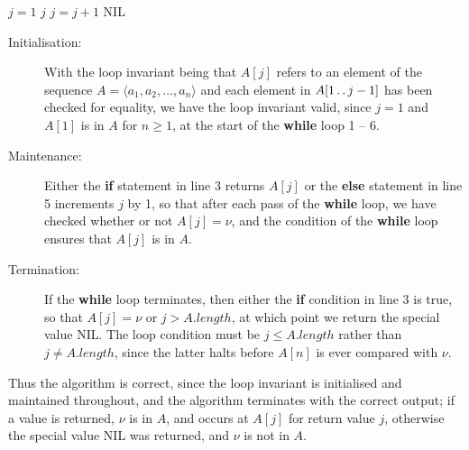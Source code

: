 \begin{algorithmic}[1]
  \STATE $j = 1$
  \RETURN $j$
  \ELSE
  \STATE $j = j + 1$
  \ENDIF
  \ENDWHILE
  \RETURN \textrm{NIL}
\end{algorithmic}

\begin{description}
  \item[Initialisation:] With the loop invariant being that $A[j]$ refers to an
    element of the sequence $A = \langle a_1, a_2, \ldots, a_n \rangle$ and
    each element in $A[1\mathinner{{\ldotp}\,{\ldotp}} j - 1]$ has been checked for equality, we
    have the loop invariant valid, since $j = 1$ and $A[1]$ is in $A$ for
    $n \ge 1$, at the start of the \textbf{while} loop 1 -- 6.
  \item[Maintenance:] Either the \textbf{if} statement in line 3 returns $A[j]$
    or the \textbf{else} statement in line 5 increments $j$ by 1, so that after
    each pass of the \textbf{while} loop, we have checked whether or not
    $A[j] = \nu$, and the condition of the \textbf{while} loop ensures that
    $A[j]$ is in $A$.
  \item[Termination:] If the \textbf{while} loop terminates, then either the
    \textbf{if} condition in line 3 is true, so that $A[j] = \nu$ or
    $j > A.\mathit{length}$, at which point we return the special value
    \textrm{NIL}. The loop condition must be $j \leq A.\mathit{length}$ rather
    than $j \neq A.\mathit{length}$, since the latter halts before $A[n]$ is
    ever compared with $\nu$.
\end{description}

Thus the algorithm is correct, since the loop invariant is initialised and
maintained throughout, and the algorithm terminates with the correct output;
if a value is returned, $\nu$ is in $A$, and occurs at $A[j]$ for return value
$j$, otherwise the special value \textrm{NIL} was returned, and $\nu$
is not in $A$.

